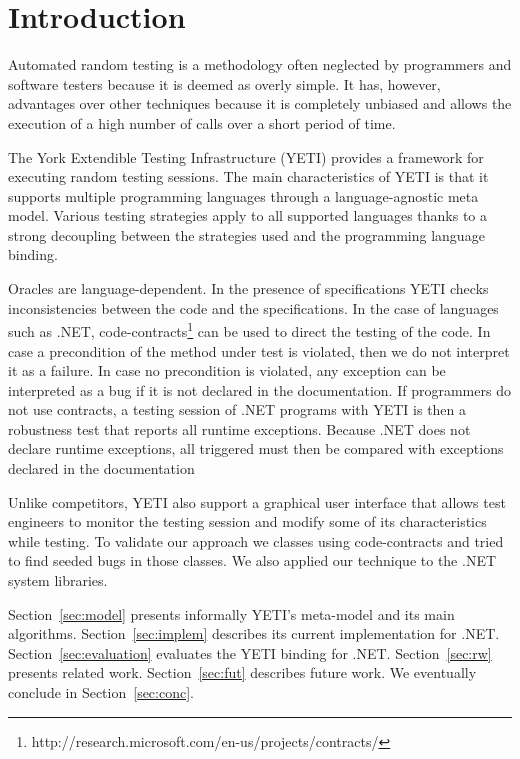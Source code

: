 \section{Introduction}\label{sec:intro}

Automated random testing is a methodology often neglected by 
programmers and software testers because it is deemed as overly
simple. It has, however, advantages over other techniques because 
it is completely unbiased and allows the execution of a high number 
of calls over a short period of time.


The York Extendible Testing Infrastructure (YETI) provides a framework 
for executing random testing sessions. The main characteristics of 
YETI is that it supports multiple programming languages through a 
language-agnostic meta model. Various testing strategies apply
to all supported languages thanks to a strong decoupling between the 
strategies used and the programming language binding. 

Oracles are language-dependent. In the presence of specifications YETI checks 
inconsistencies between the code and the specifications. In the case of 
languages such as .NET, code-contracts\footnote{http://research.microsoft.com/en-us/projects/contracts/} can be used to direct the testing 
of the code. In case a precondition of the method under test is violated, then we 
do not interpret it as a failure. In case no precondition is violated, any 
exception can be interpreted as a bug if it is not declared in the documentation. 
If programmers do not use contracts, a testing session of .NET programs with YETI 
is then a robustness test that reports all runtime exceptions. Because .NET does 
not declare runtime exceptions, all triggered must then be compared with exceptions 
declared in the documentation 
 

Unlike competitors, YETI also support a graphical user interface that 
allows test engineers to monitor the testing session and modify some 
of its characteristics while testing. To validate our approach we classes using 
code-contracts and tried to find seeded bugs in those classes. We also applied 
our technique to the .NET system libraries. 


Section~\ref{sec:model} presents informally YETI's meta-model and its main algorithms.
Section~\ref{sec:implem} describes its current implementation for .NET.
Section~\ref{sec:evaluation} evaluates the YETI binding for .NET.
Section~\ref{sec:rw} presents related work.
Section~\ref{sec:fut} describes future work.
We eventually conclude in Section~\ref{sec:conc}.
